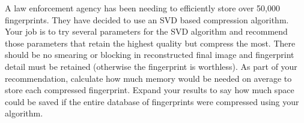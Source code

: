 \begin{problem}
A law enforcement agency has been needing to efficiently store over 50,000 fingerprints.  They have decided to use an SVD based compression algorithm.  Your job is to try several parameters for the SVD algorithm and recommend those parameters that retain the highest quality but compress the most.  There should be no smearing or blocking in reconstructed final image and fingerprint detail must be retained (otherwise the fingerprint is worthless).  As part of your recommendation, calculate how much memory would be needed on average to store each compressed fingerprint.  Expand your results to say how much space could be saved if the entire database of fingerprints were compressed using your algorithm.
\end{problem}
